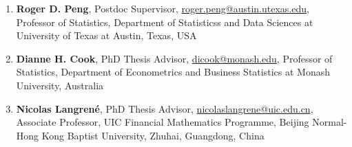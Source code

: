 \documentclass[10pt,a4paper]{article} %
\begin{document}
\begin{enumerate}[itemsep=0.1em]

    \item \textbf{Roger D. Peng}, Postdoc Supervisor, \href{mailto:roger.peng@austin.utexas.edu}{roger.peng@austin.utexas.edu}, Professor of Statistics, Department of Statisticss and Data Sciences at University of Texas at Austin, Texas, USA
    \item \textbf{Dianne H. Cook}, PhD Thesis Advisor, \href{mailto:dicook@monash.edu}{dicook@monash.edu}, Professor of Statistics, Department of Econometrics and Business Statistics at Monash University, Australia
      \item \textbf{Nicolas Langrené}, PhD Thesis Advisor, \href{mailto:nicolaslangrene@uic.edu.cn}{nicolaslangrene@uic.edu.cn}, Associate Professor, UIC Financial Mathematics Programme, Beijing Normal-Hong Kong Baptist University, Zhuhai, Guangdong, China
    


\end{enumerate}
\end{document}
